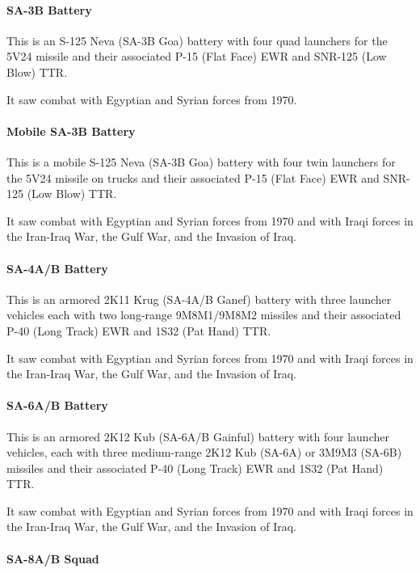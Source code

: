 \paragraph{SA-3B Battery}

This is an S-125 Neva (SA-3B Goa) battery with four quad launchers for the 5V24 missile and their associated P-15 (Flat Face) EWR and SNR-125 (Low Blow) TTR.

It saw combat with Egyptian and Syrian forces from 1970.

\paragraph{Mobile SA-3B Battery}

This is a mobile S-125 Neva (SA-3B Goa) battery with four twin launchers for the 5V24 missile on trucks and their associated P-15 (Flat Face) EWR and SNR-125 (Low Blow) TTR.

It saw combat with Egyptian and Syrian forces from 1970 and with Iraqi forces in the Iran-Iraq War, the Gulf War, and the Invasion of Iraq.

\paragraph{SA-4A/B Battery}

This is an armored 2K11 Krug (SA-4A/B Ganef) battery with three launcher vehicles each with two long-range 9M8M1/9M8M2 missiles and their associated P-40 (Long Track) EWR and 1S32 (Pat Hand) TTR.

It saw combat with Egyptian and Syrian forces from 1970 and with Iraqi forces in the Iran-Iraq War, the Gulf War, and the Invasion of Iraq.

\paragraph{SA-6A/B Battery}

This is an armored 2K12 Kub (SA-6A/B Gainful) battery with four launcher vehicles, each with three medium-range 2K12 Kub (SA-6A) or 3M9M3 (SA-6B) missiles and their associated P-40 (Long Track) EWR and 1S32 (Pat Hand) TTR.

It saw combat with Egyptian and Syrian forces from 1970 and with Iraqi forces in the Iran-Iraq War, the Gulf War, and the Invasion of Iraq.

\paragraph{SA-8A/B Squad}

